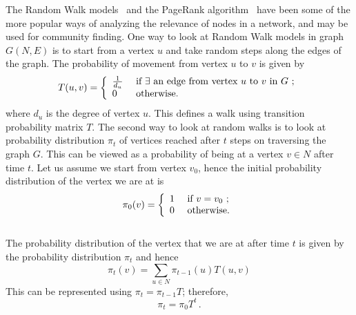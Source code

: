 \documentclass{sig-alternate}
\begin{document}
The Random Walk models~\cite{tong} and the PageRank algorithm~\cite{PageRank} have been some of the more popular ways of analyzing the relevance of nodes in a network, and may be used for community finding. One way to look at Random Walk models in graph $G(N,E)$ is to start from a vertex $u$ and take random steps along the edges of the graph. The probability of movement from vertex $u$ to $v$ is given by
 \[
T(u,v)= \left \{ \begin {array} {ll}
\frac{1}{d_u} & \mbox{ if  $ \exists$  an edge from vertex $u$ to $v$ in $G$  } ; \\
0 & \mbox{ otherwise}.
\end{array}
\right. \]
where $d_u$ is the degree of vertex $u$. This defines a walk using transition probability matrix $T$.
The second way to look at random walks is to look at probability distribution $\pi_t$ of vertices reached after $t$ steps on traversing the graph $G$. This can be viewed as a probability of  being at a vertex $v \in N$ after time $t$. Let us assume we start from vertex $v_0$, hence the initial probability distribution  of the vertex we are at is
\[
\pi_0(v)= \left \{ \begin {array} {ll}
1 & \mbox{ if  $ v=v_0$  } ; \\
0 & \mbox{ otherwise}.
\end{array}
\right. \]\\
The probability distribution of the vertex that we are at after time $t$ is given by the probability distribution $\pi_t$ and hence
\begin{equation}
\pi_t(v) =\sum_{u \in N} \pi_{t-1}(u)T(u,v)
\end{equation}
This can be represented using $\pi_t = \pi_{t-1}T$;
therefore,
\begin{equation}
\label{ eq:pi2}
\pi_t = \pi_0T^t\,.
\end{equation}
\end{document}
